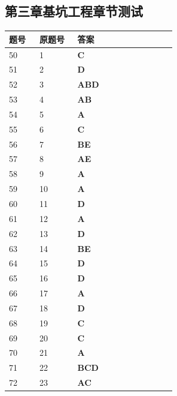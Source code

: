 \documentclass[UTF8,fontset=windows,11pt]{ctexart}
\begin{document}
\subsection*{第三章基坑工程章节测试}
\begin{longtable}{p{0.16\linewidth}p{0.2\linewidth}p{0.52\linewidth}}
\textbf{\textcolor{examnavy}{题号}} & \textbf{\textcolor{examnavy}{原题号}} & \textbf{\textcolor{answergreen}{答案}} \\
\hline
50 & 1 & \textbf{\textcolor{answergreen}{C}} \\
51 & 2 & \textbf{\textcolor{answergreen}{D}} \\
52 & 3 & \textbf{\textcolor{answergreen}{ABD}} \\
53 & 4 & \textbf{\textcolor{answergreen}{AB}} \\
54 & 5 & \textbf{\textcolor{answergreen}{A}} \\
55 & 6 & \textbf{\textcolor{answergreen}{C}} \\
56 & 7 & \textbf{\textcolor{answergreen}{BE}} \\
57 & 8 & \textbf{\textcolor{answergreen}{AE}} \\
58 & 9 & \textbf{\textcolor{answergreen}{A}} \\
59 & 10 & \textbf{\textcolor{answergreen}{A}} \\
60 & 11 & \textbf{\textcolor{answergreen}{D}} \\
61 & 12 & \textbf{\textcolor{answergreen}{A}} \\
62 & 13 & \textbf{\textcolor{answergreen}{D}} \\
63 & 14 & \textbf{\textcolor{answergreen}{BE}} \\
64 & 15 & \textbf{\textcolor{answergreen}{D}} \\
65 & 16 & \textbf{\textcolor{answergreen}{D}} \\
66 & 17 & \textbf{\textcolor{answergreen}{A}} \\
67 & 18 & \textbf{\textcolor{answergreen}{D}} \\
68 & 19 & \textbf{\textcolor{answergreen}{C}} \\
69 & 20 & \textbf{\textcolor{answergreen}{C}} \\
70 & 21 & \textbf{\textcolor{answergreen}{A}} \\
71 & 22 & \textbf{\textcolor{answergreen}{BCD}} \\
72 & 23 & \textbf{\textcolor{answergreen}{AC}} \\
\end{longtable}
\vspace{0.4em}
\end{document}
